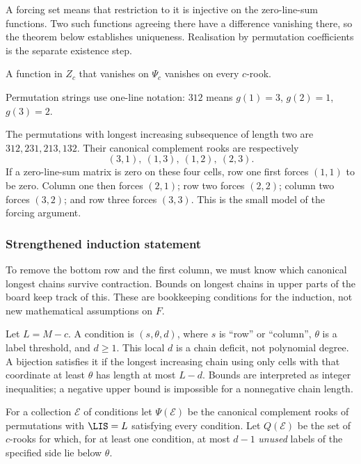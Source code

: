A forcing set means that restriction to it is injective on the
zero-line-sum functions. Two such functions agreeing there have a
difference vanishing there, so the theorem below establishes uniqueness.
Realisation by permutation coefficients is the separate existence step.

\begin{theorem}[Forcing]\label{thm:force}
A function in $Z_c$ that vanishes on $\Psi_c$ vanishes on every $c$-rook.
\end{theorem}


Permutation strings use one-line notation: $312$ means $g(1)=3$,
$g(2)=1$, $g(3)=2$.
\begin{example}
The permutations with longest increasing subsequence of length two are $312,231,213,132$. Their canonical complement rooks are respectively
\[(3,1),\ (1,3),\ (1,2),\ (2,3).
\]
If a zero-line-sum matrix is zero on these four cells, row one first forces $(1,1)$ to be zero. Column one then forces $(2,1)$; row two forces $(2,2)$; column two forces $(3,2)$; and row three forces $(3,3)$. This is the small model of the forcing argument.
\end{example}

\subsubsection{Strengthened induction statement}
To remove the bottom row and the first column, we must know which canonical longest chains survive contraction. Bounds on longest chains in upper parts of the board keep track of this. These are bookkeeping conditions for the induction, not new mathematical assumptions on $F$.

Let $L=M-c$. A condition is $(s,\theta,d)$, where $s$ is ``row'' or ``column'', $\theta$ is a label threshold, and $d\ge1$. This local $d$ is a chain deficit, not polynomial degree. A bijection satisfies it if the longest increasing chain using only cells with that coordinate at least $\theta$ has length at most $L-d$. Bounds are interpreted as integer inequalities; a negative upper bound is impossible for a nonnegative chain length.

For a collection $\mathcal E$ of conditions let $\Psi(\mathcal E)$ be the canonical complement rooks of permutations with $\LIS=L$ satisfying every condition. Let $Q(\mathcal E)$ be the set of $c$-rooks for which, for at least one condition, at most $d-1$ \emph{unused} labels of the specified side lie below $\theta$.

